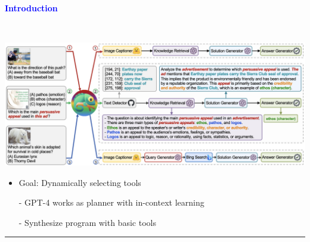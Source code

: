 \documentclass[professionalfont]{beamer}
\begin{document}
\begin{frame}
\begin{refsection}

\begin{center}
    { \textbf{\textcolor{blue}{ {\fontsize{12}{14}\selectfont Introduction } }} }
\end{center}
\\[0.2cm]

\begin{center}
    \includegraphics[width=1.0\textwidth]{figure/1.png}
\end{center}

{\fontsize{10}{14}\selectfont 
\begin{itemize}
    \item Goal: Dynamically selecting tools

    - GPT-4 works as planner with in-context learning \cite{gpt4}

    - Synthesize program with basic tools
\end{itemize}
}

\vspace{0.2cm}
\hrule
\printbibliography

\end{refsection}
\end{frame}
\end{document}
